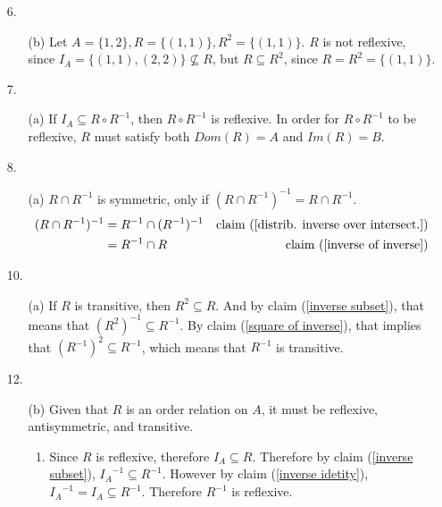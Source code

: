 \documentclass[fleqn]{article}
\begin{document}
\begin{enumerate}	
    \item[6.]
	\begin{enumerate}
		\item[(b)]
		Let \(A = \{1, 2\}, R = \{(1, 1)\}, R^2 = \{(1, 1)\}\). \(R\) is not reflexive, since \(I_A = \{(1, 1), (2, 2)\} \nsubseteq R\), but \(R \subseteq R^2\), since \(R = R^2 = \{(1, 1)\}\).
	\end{enumerate}
	
    \item[7.]
	\begin{enumerate}
		\item[(a)]
		If \(I_A \subseteq R \circ R^{-1}\), then \(R \circ R^{-1}\) is reflexive. In order for \(R \circ R^{-1}\) to be reflexive, \(R\) must satisfy both \(Dom(R) = A\) and \(Im(R) = B\).
	\end{enumerate}
	
    \item[8.]
	\begin{enumerate}
		\item[(a)]
		\(R \cap R^{-1}\) is symmetric, only if \((R \cap R^{-1})^{-1} = R \cap R^{-1}\).
		\begin{align*}
			(R \cap R^{-1})^{-1} &= R^{-1} \cap (R^{-1})^{-1} & \text{claim } (\ref{distrib. inverse over intersect.})\\
			&= R^{-1} \cap R & \text{claim } (\ref{inverse of inverse})
		\end{align*}
	\end{enumerate}
	
    \item[10.]
	\begin{enumerate}
		\item[(a)]
		If \(R\) is transitive, then \(R^2 \subseteq R\). And by claim (\ref{inverse subset}), that means that \((R^2)^{-1} \subseteq R^{-1}\). By claim (\ref{square of inverse}), that implies that \((R^{-1})^{2} \subseteq R^{-1}\), which means that \(R^{-1}\) is transitive.
	\end{enumerate}
	
    \item[12.]
	\begin{enumerate}
		\item[(b)]
		Given that \(R\) is an order relation on \(A\), it must be reflexive, antisymmetric, and transitive.
		\begin{enumerate}
			\item %
			Since \(R\) is reflexive, therefore \(I_A \subseteq R\). Therefore by claim (\ref{inverse subset}), \({I_A}^{-1} \subseteq R^{-1}\). However by claim (\ref{inverse idetity}), \({I_A}^{-1} = I_A \subseteq R^{-1}\). Therefore \(R^{-1}\) is reflexive.


\end{enumerate}
\end{enumerate}
\end{enumerate}
\end{document}
